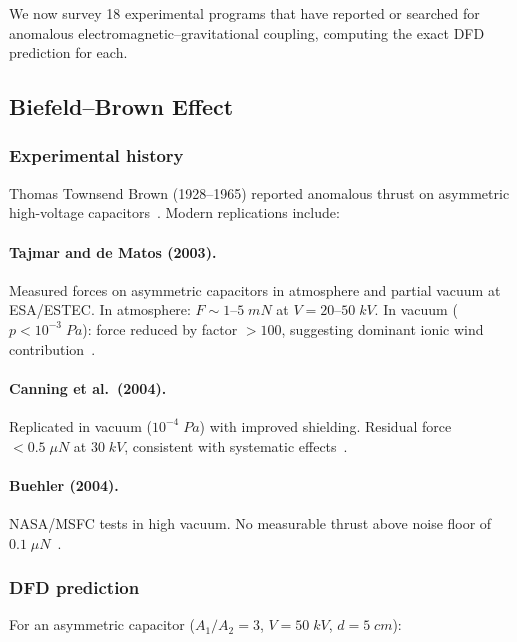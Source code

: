 \documentclass[aps,prd,twocolumn,superscriptaddress,floatfix,nofootinbib]{revtex4-2}
\begin{document}
We now survey 18 experimental programs that have reported or searched
for anomalous electromagnetic--gravitational coupling, computing the
exact DFD prediction for each.

\subsection{Biefeld--Brown Effect}\label{sec:bb}

\subsubsection{Experimental history}

Thomas Townsend Brown (1928--1965) reported anomalous thrust on
asymmetric high-voltage capacitors~\cite{Brown1928,Brown1960}.
Modern replications include:

\paragraph{Tajmar and de Matos (2003).}
Measured forces on asymmetric capacitors in atmosphere and partial
vacuum at ESA/ESTEC. In atmosphere: $F \sim 1$--$5\;\si{mN}$ at
$V = 20$--$50\;\si{kV}$. In vacuum ($p < 10^{-3}\;\si{Pa}$):
force reduced by factor $> 100$, suggesting dominant ionic wind
contribution~\cite{Tajmar2004BB}.

\paragraph{Canning et al.\ (2004).}
Replicated in vacuum ($10^{-4}\;\si{Pa}$) with improved shielding.
Residual force $< 0.5\;\si{\mu N}$ at $30\;\si{kV}$, consistent with
systematic effects~\cite{Canning2004}.

\paragraph{Buehler (2004).}
NASA/MSFC tests in high vacuum. No measurable thrust above
noise floor of $0.1\;\si{\mu N}$~\cite{Buehler2004}.

\subsubsection{DFD prediction}

For an asymmetric capacitor ($A_1/A_2 = 3$, $V = 50\;\si{kV}$,
$d = 5\;\si{cm}$):
\end{document}
